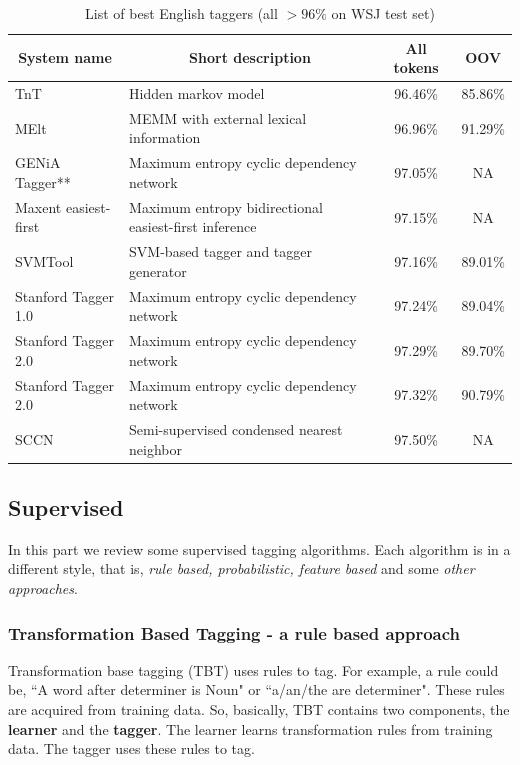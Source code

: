 \begin{table}
  \centering
    \begin{tabular}{p{4cm}p{6cm}cc}

    \multicolumn{1}{c}{\textbf{System name}} & \multicolumn{1}{c}{\textbf{Short description}} & \multicolumn{1}{c}{\textbf{All tokens}} & \multicolumn{1}{c}{\textbf{OOV}} \\
\hline
    TnT  & Hidden markov model & 96.46\% & 85.86\% \\
    MElt  & MEMM with external lexical information & 96.96\% & 91.29\% \\
    GENiA Tagger** & Maximum entropy cyclic dependency network & 97.05\% & NA \\
    Maxent easiest-first & Maximum entropy bidirectional easiest-first inference & 97.15\% & NA \\
    SVMTool & SVM-based tagger and tagger generator & 97.16\% & 89.01\% \\
    Stanford Tagger 1.0 & Maximum entropy cyclic dependency network & 97.24\% & 89.04\% \\%
    Stanford Tagger 2.0 & Maximum entropy cyclic dependency network & 97.29\% & 89.70\% \\%
    Stanford Tagger 2.0 & Maximum entropy cyclic dependency network & 97.32\% & 90.79\% \\%
    SCCN  & Semi-supervised condensed nearest neighbor & 97.50\% & NA \\%

    \end{tabular}
  \caption{List of best English taggers (all $>96\%$ on WSJ test set)}
  \label{tab:eng_state_of_the_art}
\end{table}


\subsection{Supervised}
In this part we review some supervised tagging algorithms. Each algorithm is in a different style, that is, \textit{rule based, probabilistic, feature based} and some \textit{other approaches}.  

\subsubsection{Transformation Based Tagging - a rule based approach} 
Transformation base tagging (TBT) \cite{Brill95transformation} uses rules to tag. For example, a rule could be, ``A word after determiner is Noun" or ``a/an/the are determiner". These rules are acquired from training data. So, basically, TBT contains two components, the \textbf{learner} and the \textbf{tagger}. The learner learns transformation rules from training data. The tagger uses these rules to tag. 

